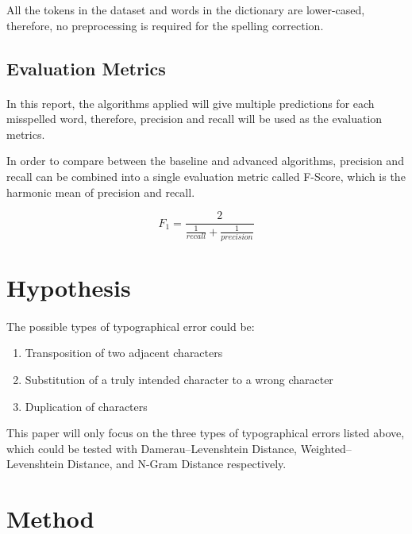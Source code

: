 \documentclass[11pt]{article}
\begin{document}
All the tokens in the dataset and words in the dictionary are lower-cased, therefore, no preprocessing is required for the spelling correction.

\subsection{Evaluation Metrics}

\paragraph{} In this report, the algorithms applied will give multiple predictions for each misspelled word, therefore, precision and recall will be used as the evaluation metrics.

In order to compare between the baseline and advanced algorithms, precision and recall can be combined into a single evaluation metric called F-Score, which is the harmonic mean of precision and recall.\cite{InfromationRetrieval}

$$ 
F_1  = \frac{2}{\frac{1}{recall} + \frac{1}{precision}}
$$

\section{Hypothesis}

\paragraph{} The possible types of typographical error could be: 

\begin{enumerate}
\item
Transposition of two adjacent characters

\item
Substitution of a truly intended character to a wrong character

\item
Duplication of characters
\end{enumerate}

This paper will only focus on the three types of typographical errors listed above, which could be tested with Damerau–Levenshtein Distance, Weighted–Levenshtein Distance, and N-Gram Distance respectively.

\section{Method}
\end{document}
